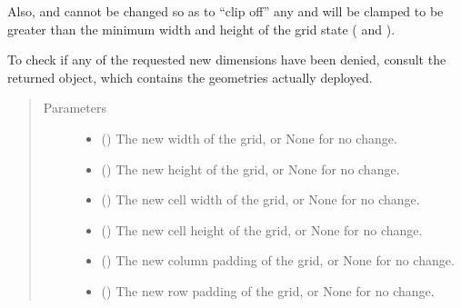 \documentclass[letterpaper,10pt,english]{sphinxmanual}
\begin{document}
\begin{fulllineitems}
\begin{fulllineitems}
Also,  and  cannot be changed so as to “clip off” any  and  will be clamped to be greater than the minimum width and
height of the grid state ( and ).

To check if any of the requested new dimensions have been denied, consult the returned  object,
which contains the geometries actually deployed.
\begin{quote}\begin{description}
\item[{Parameters}] \leavevmode\begin{itemize}
\item {} 
 () \textendash{} The new width of the grid, or None for no change.

\item {} 
 () \textendash{} The new height of the grid, or None for no change.

\item {} 
 () \textendash{} The new cell width of the grid, or None for no change.

\item {} 
 () \textendash{} The new cell height of the grid, or None for no change.

\item {} 
 () \textendash{} The new column padding of the grid, or None for no change.

\item {} 
 () \textendash{} The new row padding of the grid, or None for no change.

\end{itemize}


\end{description}
\end{quote}
\end{fulllineitems}
\end{fulllineitems}
\end{document}
